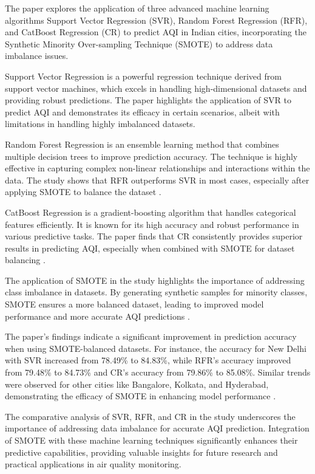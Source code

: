 \documentclass{book}
\numberwithin{equation}{section}
\numberwithin{figure}{section}
\begin{document}
The paper \cite{shishegaran2020} explores the application of three advanced machine learning algorithms Support Vector Regression (SVR), Random Forest Regression (RFR), and CatBoost Regression (CR) to predict AQI in Indian cities, incorporating the Synthetic Minority Over-sampling Technique (SMOTE) to address data imbalance issues.

Support Vector Regression is a powerful regression technique derived from support vector machines, which excels in handling high-dimensional datasets and providing robust predictions. The paper highlights the application of SVR to predict AQI and demonstrates its efficacy in certain scenarios, albeit with limitations in handling highly imbalanced datasets.

Random Forest Regression is an ensemble learning method that combines multiple decision trees to improve prediction accuracy. The technique is highly effective in capturing complex non-linear relationships and interactions within the data. The study shows that RFR outperforms SVR in most cases, especially after applying SMOTE to balance the dataset \cite{londhe2021}.

CatBoost Regression is a gradient-boosting algorithm that handles categorical features efficiently. It is known for its high accuracy and robust performance in various predictive tasks. The paper finds that CR consistently provides superior results in predicting AQI, especially when combined with SMOTE for dataset balancing \cite{janarthanan2021}.

The application of SMOTE in the study highlights the importance of addressing class imbalance in datasets. By generating synthetic samples for minority classes, SMOTE ensures a more balanced dataset, leading to improved model performance and more accurate AQI predictions \cite{gore2017}.

The paper's findings indicate a significant improvement in prediction accuracy when using SMOTE-balanced datasets. For instance, the accuracy for New Delhi with SVR increased from 78.49\% to 84.83\%, while RFR's accuracy improved from 79.48\% to 84.73\% and CR's accuracy from 79.86\% to 85.08\%. Similar trends were observed for other cities like Bangalore, Kolkata, and Hyderabad, demonstrating the efficacy of SMOTE in enhancing model performance \cite{zhao2020}.

The comparative analysis of SVR, RFR, and CR in the study underscores the importance of addressing data imbalance for accurate AQI prediction. Integration of SMOTE with these machine learning techniques significantly enhances their predictive capabilities, providing valuable insights for future research and practical applications in air quality monitoring.
\end{document}
